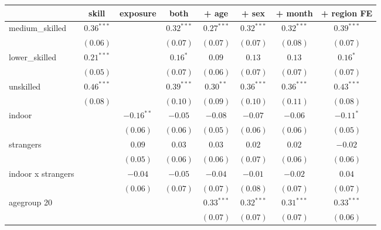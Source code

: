 
\begin{table}
\begin{center}
\begin{tabular}{l c c c c c c c }
\hline
 & skill & exposure & both & + age & + sex & + month & + region FE \\
\hline
medium\_skilled    & $0.36^{***}$ &              & $0.32^{***}$ & $0.27^{***}$ & $0.32^{***}$ & $0.32^{***}$ & $0.39^{***}$  \\
                   & $(0.06)$     &              & $(0.07)$     & $(0.07)$     & $(0.07)$     & $(0.08)$     & $(0.07)$      \\
lower\_skilled     & $0.21^{***}$ &              & $0.16^{*}$   & $0.09$       & $0.13$       & $0.13$       & $0.16^{*}$    \\
                   & $(0.05)$     &              & $(0.07)$     & $(0.06)$     & $(0.07)$     & $(0.07)$     & $(0.07)$      \\
unskilled          & $0.46^{***}$ &              & $0.39^{***}$ & $0.30^{**}$  & $0.36^{***}$ & $0.36^{***}$ & $0.43^{***}$  \\
                   & $(0.08)$     &              & $(0.10)$     & $(0.09)$     & $(0.10)$     & $(0.11)$     & $(0.08)$      \\
indoor             &              & $-0.16^{**}$ & $-0.05$      & $-0.08$      & $-0.07$      & $-0.06$      & $-0.11^{*}$   \\
                   &              & $(0.06)$     & $(0.06)$     & $(0.05)$     & $(0.06)$     & $(0.06)$     & $(0.05)$      \\
strangers          &              & $0.09$       & $0.03$       & $0.03$       & $0.02$       & $0.02$       & $-0.02$       \\
                   &              & $(0.05)$     & $(0.06)$     & $(0.06)$     & $(0.07)$     & $(0.06)$     & $(0.06)$      \\
indoor x strangers &              & $-0.04$      & $-0.05$      & $-0.04$      & $-0.01$      & $-0.02$      & $0.04$        \\
                   &              & $(0.06)$     & $(0.07)$     & $(0.07)$     & $(0.08)$     & $(0.07)$     & $(0.07)$      \\
agegroup 20        &              &              &              & $0.33^{***}$ & $0.32^{***}$ & $0.31^{***}$ & $0.33^{***}$  \\
                   &              &              &              & $(0.07)$     & $(0.07)$     & $(0.07)$     & $(0.06)$      \\

\end{tabular}
\end{center}
\end{table}
